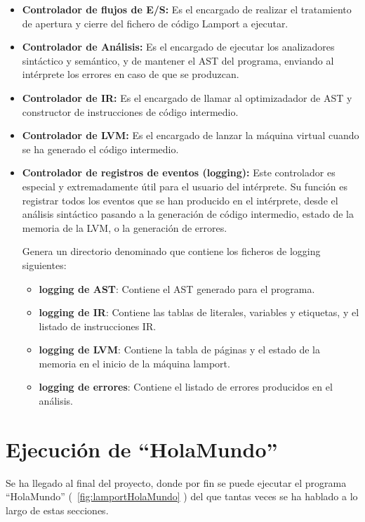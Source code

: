 \begin{itemize}
    \item \textbf{Controlador de flujos de E/S:} Es el encargado de realizar el tratamiento de apertura y cierre del fichero de código Lamport a ejecutar.
    \item \textbf{Controlador de Análisis:} Es el encargado de ejecutar los analizadores sintáctico y semántico, y de mantener el AST del programa, enviando al intérprete los errores en caso de que se produzcan.
    \item \textbf{Controlador de IR:} Es el encargado de llamar al optimizadador de AST y constructor de instrucciones de código intermedio.
    \item \textbf{Controlador de LVM:} Es el encargado de lanzar la máquina virtual cuando se ha generado el código intermedio.
    \item \textbf{Controlador de registros de eventos (logging):} Este controlador es especial y extremadamente útil para el usuario del intérprete. Su función es registrar todos los eventos que se han producido en el intérprete, desde el análisis sintáctico pasando a la generación de código intermedio, estado de la memoria de la LVM, o la generación de errores.

    Genera un directorio denominado  que contiene los ficheros de logging siguientes:
    \begin{itemize}
        \item \textbf{logging de AST}: Contiene el AST generado para el programa.
        \item \textbf{logging de IR}: Contiene las tablas de literales, variables y etiquetas, y el listado de instrucciones IR.
        \item \textbf{logging de LVM}: Contiene la tabla de páginas y el estado de la memoria en el inicio de la máquina lamport.
        \item \textbf{logging de errores}: Contiene el listado de errores producidos en el análisis.
    \end{itemize}
\end{itemize}

\section{Ejecución de ``HolaMundo''}
Se ha llegado al final del proyecto, donde por fin se puede ejecutar el programa ``HolaMundo'' (~\ref{fig:lamportHolaMundo} ) del que tantas veces se ha hablado a lo largo de estas secciones. 

